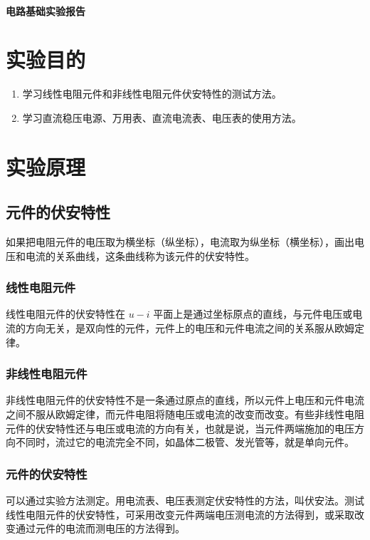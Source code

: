 \documentclass[a4paper,utf8]{article}
\begin{document}
\begin{center}
    {\mbox{}\\[7em]\bfseries\songti%
    电路基础实验报告}\\[34mm]
\end{center}
\newpage
\section{实验目的}
\begin{enumerate}
    \item 学习线性电阻元件和非线性电阻元件伏安特性的测试方法。
    \item 学习直流稳压电源、万用表、直流电流表、电压表的使用方法。
\end{enumerate}

\section{实验原理}%
    \subsection{元件的伏安特性}
    如果把电阻元件的电压取为横坐标（纵坐标），电流取为纵坐标（横坐标），画出电压和电流的关系曲线，这条曲线称为该元件的伏安特性。
    \subsubsection{线性电阻元件}
    线性电阻元件的伏安特性在 $u-i$ 平面上是通过坐标原点的直线，与元件电压或电流的方向无关，是双向性的元件，元件上的电压和元件电流之间的关系服从欧姆定律。
        
    \subsubsection{非线性电阻元件}
    非线性电阻元件的伏安特性不是一条通过原点的直线，所以元件上电压和元件电流之间不服从欧姆定律，而元件电阻将随电压或电流的改变而改变。有些非线性电阻元件的伏安特性还与电压或电流的方向有关，也就是说，当元件两端施加的电压方向不同时，流过它的电流完全不同，如晶体二极管、发光管等，就是单向元件。
    \subsubsection{元件的伏安特性}
    可以通过实验方法测定。用电流表、电压表测定伏安特性的方法，叫伏安法。测试线性电阻元件的伏安特性，可采用改变元件两端电压测电流的方法得到，或采取改变通过元件的电流而测电压的方法得到。
\end{document}
